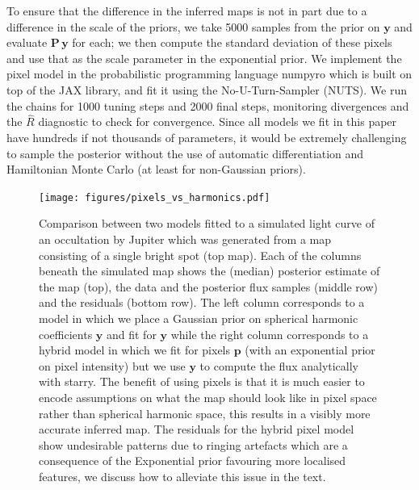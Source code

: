 \documentclass[12pt,dvipsnames]{report}
\renewcommand{\vec}[1]{\boldsymbol{\mathbf{#1}}}
\begin{document}
To ensure that the difference in the inferred maps is not in part due to a difference in the scale of the priors, we take 5000 samples from the prior on $\vec y$ 
and evaluate $\mathbf{P}\,\mathbf{y}$ for each; we then compute the standard deviation of these pixels and use that as the scale parameter in the exponential prior.
We implement the pixel model in the probabilistic programming language \textsf{numpyro} 
\citep{arXiv:1912.11554} which is built on top of the \textsf{JAX} 
library, and fit it using the No-U-Turn-Sampler (NUTS).
We run the chains for 1000 tuning steps and 2000 final steps, monitoring divergences 
\citep{2013arXiv1312.0906B} and the $\hat R$ diagnostic  \citep{1992StaSc...7..457G} to 
check for convergence.
Since all models we fit in this paper have hundreds if not thousands of parameters, it 
would be extremely challenging to sample the posterior  without the use of automatic 
differentiation and Hamiltonian Monte Carlo (at least for non-Gaussian priors).

\begin{figure}[t!]
    \begin{centering}
    \texttt{[image: figures/pixels\_vs\_harmonics.pdf]}
    \caption{
        Comparison between two models fitted to a simulated light curve of an occultation by Jupiter which was generated from a map consisting of a single bright spot (top map).  
       Each of the columns beneath the simulated map shows the (median) posterior estimate of the map (top), the data and the posterior flux samples (middle row) and the residuals (bottom row).
        The left column corresponds to a model in which we place a Gaussian prior on spherical harmonic coefficients $\mathbf{y}$ and fit for $\mathbf{y}$ while the right column corresponds to a hybrid model in which we fit for pixels $\mathbf{p}$ (with an exponential prior on pixel intensity) but we use $\mathbf{y}$ to compute the flux analytically with \textsf{starry}.
        The benefit of using pixels is that it is much easier to encode assumptions on what the map should look like in pixel space rather than spherical harmonic space, this results in a visibly more accurate inferred map.
        The residuals for the hybrid pixel model show undesirable patterns due to ringing artefacts which are a consequence of the Exponential prior favouring more localised features, we discuss how to alleviate this issue in the text.
    }
    \label{fig:pixels_vs_harmonics}
    \end{centering}
\end{figure}
\end{document}
